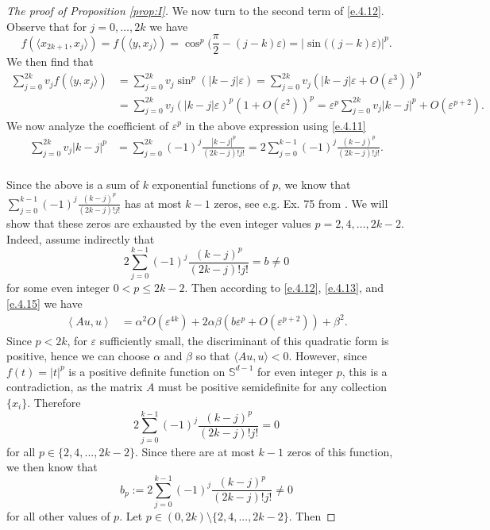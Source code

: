 \documentclass[11pt, leqno]{amsart}
\def\S{\mathbb S}
\theoremstyle{definition}
\numberwithin{equation}{section}
\begin{document}
\begin{proof}[The proof of Proposition \ref{prop:I}]
We now turn to the second term of \eqref{e.4.12}. Observe that for $j=0, \dots, 2k$ we have
\begin{equation}\label{e.4.14}
 f( \langle x_{2k+1}, x_j \rangle) = f( \langle y , x_j \rangle)  =  \cos^p \bigg(\frac{\pi}2 - (j-k) \varepsilon \bigg)      =  \big| \sin \big( (j-k) \varepsilon \big)     \big|^p.
\end{equation}
We then find that 
\begin{equation}\label{e.4.15}
\begin{aligned}
\sum_{j=0}^{2k} v_j f( \langle y, x_j \rangle) & = \sum_{j=0}^{2k} v_j \sin^p \left(  |k-j| \varepsilon \right)   = \sum_{j=0}^{2k} v_j \left(  { |k-j| \varepsilon} + O( \varepsilon^3) \right)^p \\
& = \sum_{j=0}^{2k} v_j \left(   |k-j| \varepsilon \right)^p \left(1+ O( \varepsilon^2) \right)^p  =   \varepsilon^p \sum_{j=0}^{2k}  v_j |k-j|^p + O( \varepsilon^{p + 2}) .
\end{aligned}
\end{equation}
We now analyze the coefficient  of $\varepsilon^p$ in  the above expression using \eqref{e.4.11} 
\begin{equation*}
\begin{aligned}
\sum_{j=0}^{2k}  v_j |k-j|^p & = 
  \sum_{j=0}^{2k} (-1)^j \frac{|k-j|^p}{(2k-j)! j!}   = 2 \sum_{j=0}^{k-1} (-1)^j \frac{(k-j)^p}{(2k-j)! j!}. \\
\end{aligned}
\end{equation*}
\vskip2mm

\noindent Since the above is a sum of $k$ exponential functions of $p$, we know that  $ \sum_{j=0}^{k-1} (-1)^j \frac{(k-j)^p}{(2k-j)! j!}$ has at most $k-1$ zeros, see e.g. Ex. 75 from \cite[pg. 46]{polyaszego}.  We will show that these zeros are exhausted by the even integer values $p=2, 4, \dots, 2k-2$.  Indeed, assume  indirectly  that
$$ 2 \sum_{j=0}^{k-1} (-1)^j \frac{(k-j)^p}{(2k-j)! j!} = b \neq 0$$
for some even integer $0 < p \leq 2k-2$. Then according to \eqref{e.4.12}, \eqref{e.4.13}, and \eqref{e.4.15} we have
\begin{equation*}
\begin{aligned}
\left\langle  Au, u  \right\rangle & = \alpha^2 O(\varepsilon^{4k}) + 2 \alpha \beta \left( b \varepsilon^p + O( \varepsilon^{p + 2}) \right) + \beta^2.
\end{aligned}
\end{equation*}
Since $p<2k$, for $\varepsilon$ sufficiently small, the discriminant of this quadratic form is positive, hence we can choose $\alpha$ and $\beta$ so that $\langle Au, u \rangle < 0$.  However, since $f(t) = |t|^p$ is a positive definite function on $\S^{d-1}$ for even integer  $p$, this is a contradiction, as the matrix $A$ must be positive semidefinite for any collection $\{ x_i\}$. Therefore $$ 2 \sum_{j=0}^{k-1} (-1)^j \frac{(k-j)^p}{(2k-j)! j!} = 0$$
for all $p \in \{2, 4, ..., 2k-2 \}$. Since there are at most $k-1$ zeros of this function, we then know that
$$  b_p :=  2 \sum_{j=0}^{k-1} (-1)^j \frac{(k-j)^p}{(2k-j)! j!} \neq 0$$
for all other  values of $p$. Let $p \in (0, 2k) \setminus \{2, 4, ..., 2k-2\}$. Then 


\end{proof}
\end{document}
